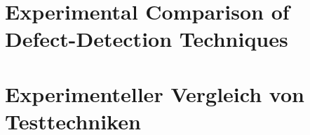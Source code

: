 %
%
\parindent0pt

\ifenglish
\section*{Experimental Comparison of Defect-Detection Techniques}

\fi
\ifgerman
\section*{Experimenteller Vergleich von Testtechniken}

\fi

